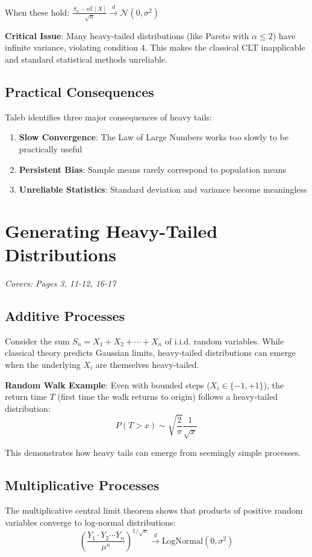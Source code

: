 \documentclass[11pt]{article}
\begin{document}
When these hold: $\frac{S_n - n\mathbb{E}[X]}{\sqrt{n}} \xrightarrow{d} \mathcal{N}(0, \sigma^2)$

\textbf{Critical Issue}: Many heavy-tailed distributions (like Pareto with $\alpha \leq 2$) have infinite variance, violating condition 4. This makes the classical CLT inapplicable and standard statistical methods unreliable.

\subsection{Practical Consequences}
Taleb identifies three major consequences of heavy tails:
\begin{enumerate}
    \item \textbf{Slow Convergence}: The Law of Large Numbers works too slowly to be practically useful
    \item \textbf{Persistent Bias}: Sample means rarely correspond to population means
    \item \textbf{Unreliable Statistics}: Standard deviation and variance become meaningless
\end{enumerate}

\section{Generating Heavy-Tailed Distributions}
\textit{Covers: Pages 3, 11-12, 16-17}

\subsection{Additive Processes}
Consider the sum $S_n = X_1 + X_2 + \cdots + X_n$ of i.i.d. random variables. While classical theory predicts Gaussian limits, heavy-tailed distributions can emerge when the underlying $X_i$ are themselves heavy-tailed.

\textbf{Random Walk Example}: Even with bounded steps ($X_i \in \{-1, +1\}$), the return time $T$ (first time the walk returns to origin) follows a heavy-tailed distribution:
$$P(T > x) \sim \sqrt{\frac{2}{\pi}} \frac{1}{\sqrt{x}}$$

This demonstrates how heavy tails can emerge from seemingly simple processes.

\subsection{Multiplicative Processes}
The multiplicative central limit theorem shows that products of positive random variables converge to log-normal distributions:
$$\left(\frac{Y_1 \cdot Y_2 \cdots Y_n}{\mu^n}\right)^{1/\sqrt{n}} \xrightarrow{d} \text{LogNormal}(0, \sigma^2)$$
\end{document}
